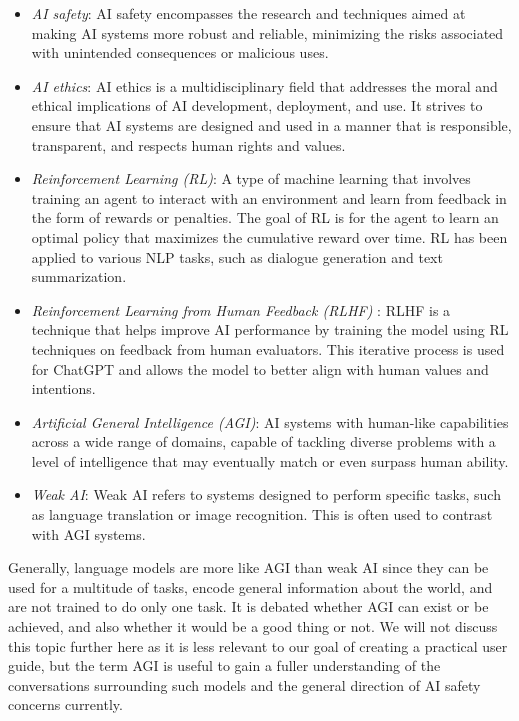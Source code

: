 \documentclass[12pt]{article}
\begin{document}
\begin{itemize}
    \item \textit{AI safety}\label{item:ai-safety}: AI safety encompasses the research and techniques aimed at making AI systems more robust and reliable, minimizing the risks associated with unintended consequences or malicious uses.
    
    \item \textit{AI ethics}\label{item:ai-ethics}: AI ethics is a multidisciplinary field that addresses the moral and ethical implications of AI development, deployment, and use. It strives to ensure that AI systems are designed and used in a manner that is responsible, transparent, and respects human rights and values.
    
    \item\textit{Reinforcement Learning (RL)}: A type of machine learning that involves training an agent to interact with an environment and learn from feedback in the form of rewards or penalties. The goal of RL is for the agent to learn an optimal policy that maximizes the cumulative reward over time. RL has been applied to various NLP tasks, such as dialogue generation and text summarization.
    
    \item \textit{Reinforcement Learning from Human Feedback (RLHF)} \label{item:rlhf}: RLHF is a technique that helps improve AI performance by training the model using RL techniques on feedback from human evaluators. This iterative process is used for ChatGPT and allows the model to better align with human values and intentions.
    
    \item \textit{Artificial General Intelligence (AGI)}\label{item:agi}: AI systems with human-like capabilities across a wide range of domains, capable of tackling diverse problems with a level of intelligence that may eventually match or even surpass human ability. 
    
    \item \textit{Weak AI}\label{item:weak-ai}: Weak AI refers to systems designed to perform specific tasks, such as language translation or image recognition. This is often used to contrast with AGI systems. 
\end{itemize}
Generally, language models are more like AGI than weak AI since they can be used for a multitude of tasks, encode general information about the world, and are not trained to do only one task. It is debated whether AGI can exist or be achieved, and also whether it would be a good thing or not. We will not discuss this topic further here as it is less relevant to our goal of creating a practical user guide, but the term AGI is useful to gain a fuller understanding of the conversations surrounding such models and the general direction of AI safety concerns currently.  
\end{document}
